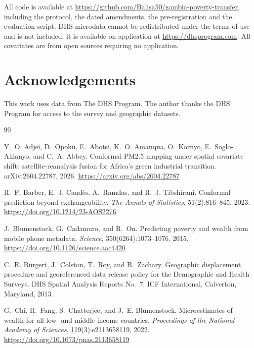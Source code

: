 \documentclass[11pt]{article}
\begin{document}
All code is available at \url{https://github.com/Balisa50/gambia-poverty-transfer},
including the protocol, the dated amendments, the pre-registration and the
evaluation script. DHS microdata cannot be redistributed under the terms of use
and is not included; it is available on application at
\url{https://dhsprogram.com}. All covariates are from open sources requiring no
application.

\section*{Acknowledgements}

This work uses data from The DHS Program. The author thanks the DHS Program for
access to the survey and geographic datasets.

\begin{thebibliography}{99}
\setlength{\itemsep}{2pt}

Y.~O. Adjei, D.~Opoku, E.~Abotsi, K.~O. Amanqua, O.~Kornyo, E.~Soglo-Ahianyo,
and C.~A. Abbey.
\newblock Conformal PM2.5 mapping under spatial covariate shift: satellite-reanalysis
fusion for Africa's green industrial transition.
\newblock arXiv:2604.22787, 2026.
\newblock \url{https://arxiv.org/abs/2604.22787}

R.~F. Barber, E.~J. Cand\`es, A.~Ramdas, and R.~J. Tibshirani.
\newblock Conformal prediction beyond exchangeability.
\newblock \emph{The Annals of Statistics}, 51(2):816--845, 2023.
\newblock \url{https://doi.org/10.1214/23-AOS2276}

J.~Blumenstock, G.~Cadamuro, and R.~On.
\newblock Predicting poverty and wealth from mobile phone metadata.
\newblock \emph{Science}, 350(6264):1073--1076, 2015.
\newblock \url{https://doi.org/10.1126/science.aac4420}

C.~R. Burgert, J.~Colston, T.~Roy, and B.~Zachary.
\newblock Geographic displacement procedure and georeferenced data release
policy for the Demographic and Health Surveys.
\newblock DHS Spatial Analysis Reports No.~7. ICF International, Calverton,
Maryland, 2013.

G.~Chi, H.~Fang, S.~Chatterjee, and J.~E. Blumenstock.
\newblock Microestimates of wealth for all low- and middle-income countries.
\newblock \emph{Proceedings of the National Academy of Sciences},
119(3):e2113658119, 2022.
\newblock \url{https://doi.org/10.1073/pnas.2113658119}


\end{thebibliography}
\end{document}
